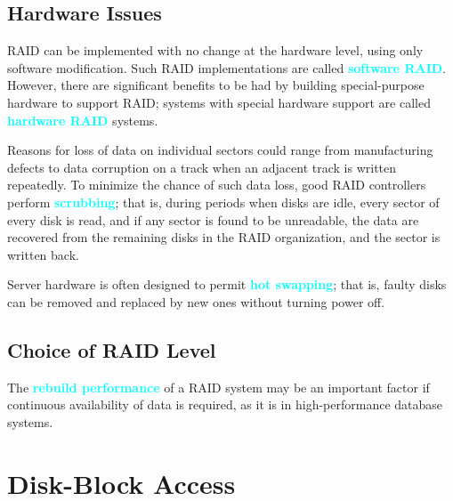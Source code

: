 \documentclass[a4paper,12pt,twoside,openany]{book}
\newcommand{\textcy}[1]{\textbf{\textcolor{cyan}{#1}}}
\begin{document}
\subsection{Hardware Issues}

RAID can be implemented with no change at the hardware level, using only software modification. Such RAID implementations are called \textcy{software RAID}. However, there are significant benefits to be had by building special-purpose hardware to support RAID; systems with special hardware support are called \textcy{hardware RAID} systems.

Reasons for loss of data on individual sectors could range from manufacturing defects to data corruption on a track when an adjacent track is written repeatedly. To minimize the chance of such data loss, good RAID controllers perform \textcy{scrubbing}; that is, during periods when disks are idle, every sector of every disk is read, and if any sector is found to be unreadable, the data are recovered from the remaining disks in the RAID organization, and the sector is written back.

Server hardware is often designed to permit \textcy{hot swapping}; that is, faulty disks can be removed and replaced by new ones without turning power off.

\subsection{Choice of RAID Level}

The \textcy{rebuild performance} of a RAID system may be an important factor if continuous availability of data is required, as it is in high-performance database systems.

\section{Disk-Block Access}
\end{document}
